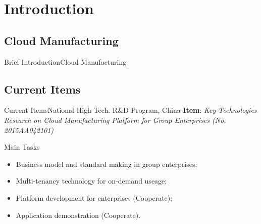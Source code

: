 \section{Introduction}

\subsection{Cloud Manufacturing}
\begin{frame}{Brief Introduction}{Cloud Manufacturing}

\end{frame}

\subsection{Current Items}

\begin{frame}{Current Items}{National High-Tech. R\&D Program, China}
\textbf{Item}: \textit{Key Technologies Research on Cloud Manufacturing Platform for Group Enterprises (No. 2015AA042101)}
\begin{block}{Main Tasks}
  \begin{itemize}
  \item Business model and standard making in group enterprises;
  \item Multi-tenancy technology for on-demand useage;
  \item Platform development for enterprises (Cooperate);
  \item Application demonstration (Cooperate).
  \end{itemize}
\end{block}
\end{frame}

